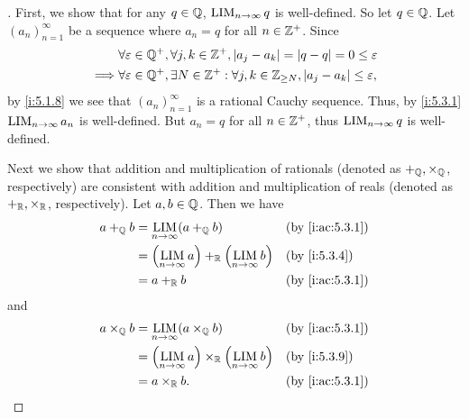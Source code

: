 \begin{proof}[]
  First, we show that for any \(q \in \mathbb{Q}\), \(\operatorname*{LIM}_{n \to \infty} q\) is well-defined.
  So let \(q \in \mathbb{Q}\).
  Let \((a_n)_{n = 1}^\infty\) be a sequence where \(a_n = q\) for all \(n \in \mathbb{Z}^+\).
  Since
  \begin{align*}
             & \forall \varepsilon \in \mathbb{Q}^+, \forall j, k \in \mathbb{Z}^+, \left\lvert a_j - a_k\right\rvert = \left\lvert q - q\right\rvert = 0 \leq \varepsilon            \\
    \implies & \forall \varepsilon \in \mathbb{Q}^+, \exists N \in \mathbb{Z}^+ : \forall j, k \in \mathbb{Z}_{\geq N}, \left\lvert a_j - a_k\right\rvert \leq \varepsilon,
  \end{align*}
  by \cref{i:5.1.8} we see that \((a_n)_{n = 1}^\infty\) is a rational Cauchy sequence.
  Thus, by \cref{i:5.3.1} \(\operatorname*{LIM}_{n \to \infty} a_n\) is well-defined.
  But \(a_n = q\) for all \(n \in \mathbb{Z}^+\), thus \(\operatorname*{LIM}_{n \to \infty} q\) is well-defined.

  Next we show that addition and multiplication of rationals (denoted as \(+_{\mathbb{Q}}, \times_{\mathbb{Q}}\), respectively) are consistent with addition and multiplication of reals (denoted as \(+_{\mathbb{R}}, \times_{\mathbb{R}}\), respectively).
  Let \(a, b \in \mathbb{Q}\).
  Then we have
  \begin{align*}
    a +_\Q b & = \LIM_{n \to \infty} (a +_\Q b)                             &  & \by{i:ac:5.3.1} \\
             & = \pa{\LIM_{n \to \infty} a} +_\R \pa{\LIM_{n \to \infty} b} &  & \by{i:5.3.4}    \\
             & = a +_\R b                                                   &  & \by{i:ac:5.3.1}
  \end{align*}
  and
  \begin{align*}
    a \times_\Q b & = \LIM_{n \to \infty} (a \times_\Q b)                             &  & \by{i:ac:5.3.1} \\
                  & = \pa{\LIM_{n \to \infty} a} \times_\R \pa{\LIM_{n \to \infty} b} &  & \by{i:5.3.9}    \\
                  & = a \times_\R b.                                                  &  & \by{i:ac:5.3.1}
  \end{align*}


\end{proof}
